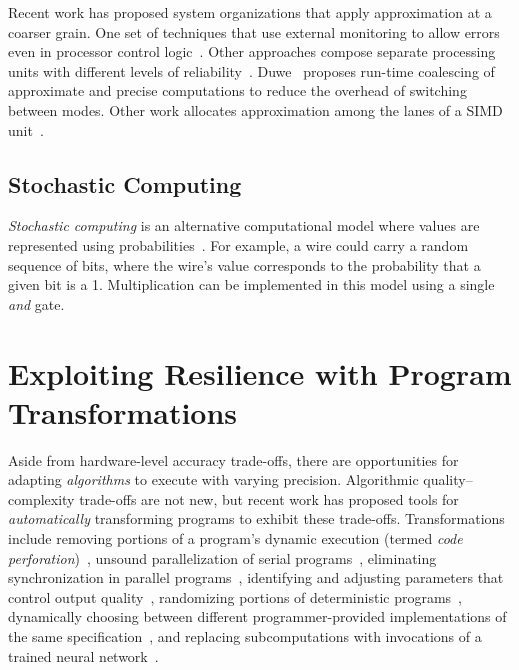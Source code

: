 Recent work has proposed system organizations that apply approximation at a
coarser grain.
One set of techniques that use external monitoring to
allow errors even in processor control logic~\cite{martonosi-date, commguard}.
Other approaches compose separate processing units with different levels of
reliability~\cite{ersa}.
Duwe~\cite{duwe-thesis} proposes run-time coalescing of approximate and
precise computations to reduce the overhead of switching between modes.
Other work allocates approximation among the lanes of a SIMD
unit~\cite{tabsh}.

\subsection{Stochastic Computing}

\emph{Stochastic computing} is an alternative computational model where values
are represented using probabilities~\cite{pcmos, pcmos-cacm,
palem-dac-position, stochasticproc, storm, lyric, mansinghka-circuits}.
For example, a wire could carry a random sequence of bits, where the wire's
value corresponds
to the probability that a given bit is a 1.
Multiplication can be implemented in this model using a single \emph{and}
gate.


\section{Exploiting Resilience with Program Transformations}
\label{sec:related:software}

Aside from hardware-level accuracy trade-offs, there are opportunities for
adapting \emph{algorithms} to execute with varying precision. Algorithmic
quality--complexity trade-offs are not new, but recent work has
proposed
tools for \emph{automatically} transforming programs to exhibit these
trade-offs.
Transformations include removing portions of a program's dynamic execution
(termed \emph{code perforation})~\cite{perforation}, unsound
parallelization of serial programs~\cite{quickstep}, eliminating
synchronization in parallel programs~\cite{dubstep, races-ibm, hogwild,
forgiving-parallel},
identifying and adjusting parameters that control output
quality~\cite{dynamicknobs}, randomizing portions of deterministic
programs~\cite{zhu-popl12, sasa-sas11}, dynamically choosing between
different programmer-provided implementations of the same
specification~\cite{green, virus, petabricks, taco-soc, ansel-autotuning,
scalable-classifier}, and replacing subcomputations with invocations
of a trained neural network~\cite{npu}.

